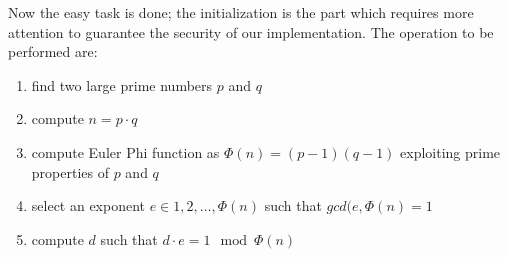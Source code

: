 \documentclass{article}
\begin{document}
Now the easy task is done; the initialization is the part which requires more attention to guarantee the security of our implementation. The operation to be performed are:

\begin{enumerate}
	\item find two large prime numbers $p$ and $q$
	\item compute $n = p \cdot q$
	\item compute Euler Phi function as $\Phi(n) = (p-1)(q-1)$ exploiting prime properties of $p$ and $q$
	\item select an exponent $e \in {1, 2, \dots, \Phi(n)}$ such that $gcd(e, \Phi(n) = 1$
	\item compute $d$ such that $d \cdot e = 1 \mod \Phi(n)$
\end{enumerate}
\end{document}
